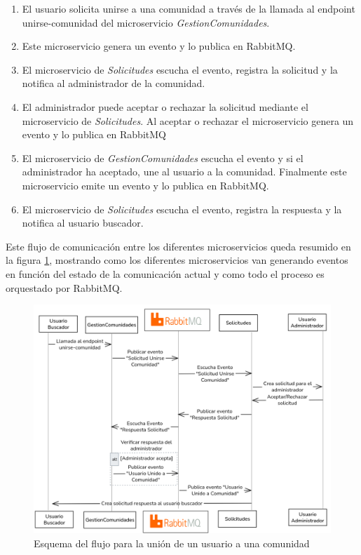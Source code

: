 \vspace{0.5em}
\begin{enumerate}
  \item El usuario solicita unirse a una comunidad a través de la llamada al endpoint unirse-comunidad del microservicio \textit{GestionComunidades}.
  \item Este microservicio genera un evento y lo publica en RabbitMQ.
  \item El microservicio de \textit{Solicitudes} escucha el evento, registra la solicitud y la notifica al administrador de la comunidad.
  \item El administrador puede aceptar o rechazar la solicitud mediante el microservicio de \textit{Solicitudes}. Al aceptar o rechazar el microservicio genera un evento y lo publica en RabbitMQ
  \item El microservicio de \textit{GestionComunidades} escucha el evento y si el administrador ha aceptado, une al usuario a la comunidad. Finalmente este microservicio emite un evento y lo publica en RabbitMQ.
  \item El microservicio de \textit{Solicitudes} escucha el evento, registra la respuesta y la notifica al usuario buscador.
\end{enumerate}

\vspace{0.5em}

Este flujo de comunicación entre los diferentes microservicios queda resumido en la figura \ref{fig:union-comunidad}, mostrando como los diferentes microservicios van generando eventos en función del estado de la comunicación actual y como todo el proceso es orquestado por RabbitMQ.

\begin{figure}[H]
  \centering
  \includegraphics[width=1\textwidth]{fotos/usuarioUneComunidad.png}
  \caption{Esquema del flujo para la unión de un usuario a una comunidad}
  \label{fig:union-comunidad}
\end{figure}





